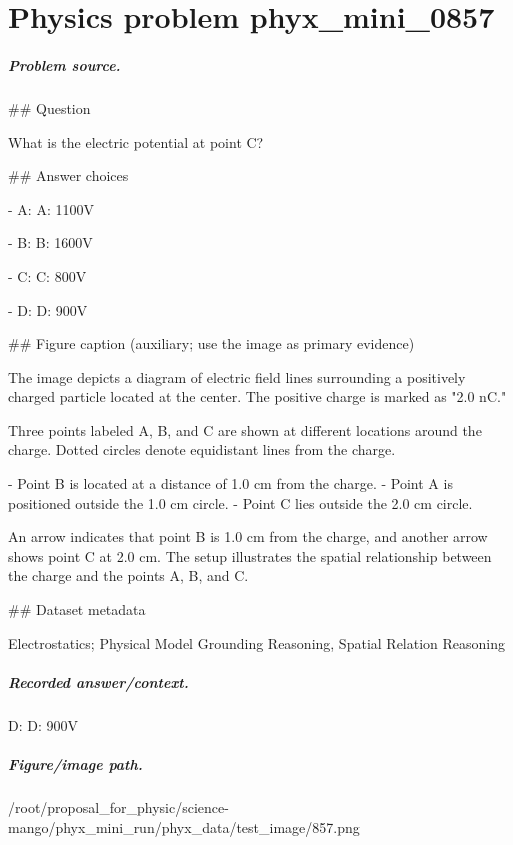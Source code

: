 
\chapter{Physics problem phyx\_mini\_0857}
\label{ch:PhyXMiniProblems_problem_phyx_mini_0857}

\paragraph{Problem source.}
\#\# Question

What is the electric potential at point C?

\#\# Answer choices

- A: A: 1100V

- B: B: 1600V

- C: C: 800V

- D: D: 900V

\#\# Figure caption (auxiliary; use the image as primary evidence)

The image depicts a diagram of electric field lines surrounding a positively charged particle located at the center. The positive charge is marked as "2.0 nC."

Three points labeled A, B, and C are shown at different locations around the charge. Dotted circles denote equidistant lines from the charge. 

- Point B is located at a distance of 1.0 cm from the charge.
- Point A is positioned outside the 1.0 cm circle.
- Point C lies outside the 2.0 cm circle.

An arrow indicates that point B is 1.0 cm from the charge, and another arrow shows point C at 2.0 cm. The setup illustrates the spatial relationship between the charge and the points A, B, and C.

\#\# Dataset metadata

Electrostatics; Physical Model Grounding Reasoning, Spatial Relation Reasoning

\paragraph{Recorded answer/context.}
D: D: 900V

\paragraph{Figure/image path.}
/root/proposal\_for\_physic/science-mango/phyx\_mini\_run/phyx\_data/test\_image/857.png

